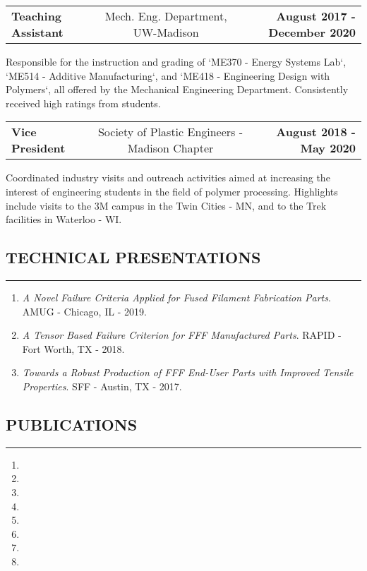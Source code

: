 \documentclass[11pt,letterpaper]{article}
\makeatletter
\newcommand{\headerrow}[3]
{\vspace{0.4em}
\noindent
\begin{tabular*}{\textwidth}{l @{\extracolsep{\fill}} cr}
	\textbf{#1} & %
	#2 &		  %
	\textbf{#3}\\ %
\end{tabular*}}
\makeatother
\begin{document}
\headerrow
{Teaching Assistant}
{Mech. Eng. Department, UW-Madison} 
{August 2017 - December 2020}
Responsible for the instruction and grading of `ME370 - Energy Systems Lab`, `ME514 - Additive Manufacturing`, and `ME418 - Engineering Design with Polymers`, all offered by the Mechanical Engineering Department. Consistently received high ratings from students.

\headerrow
{Vice President}
{Society of Plastic Engineers - Madison Chapter} 
{August 2018 - May 2020}
Coordinated industry visits and outreach activities aimed at increasing the interest of engineering students in the field of polymer processing. Highlights include visits to the 3M campus in the Twin Cities - MN, and to the Trek facilities in Waterloo - WI. 

\subsection*{TECHNICAL PRESENTATIONS}
\vspace{-0.5em}
\hrule
\vspace{0.6em}

\begin{enumerate}
	\item \emph{A Novel Failure Criteria Applied for Fused Filament Fabrication Parts}. AMUG - Chicago, IL - 2019. 
	\item \emph{A Tensor Based Failure Criterion for FFF Manufactured Parts}.  RAPID - Fort Worth, TX - 2018.
	\item \emph{Towards a Robust Production of FFF End-User Parts with Improved Tensile Properties}. SFF - Austin, TX - 2017. 

\end{enumerate}


\subsection*{PUBLICATIONS}
	\vspace{-0.5em}
	\hrule
	\vspace{0.6em}

\begin{enumerate}
	\item {}
	\item {}
	\item {}
	\item {}
	\item {}
	\item {}
	\item {}
	\item {}
\end{enumerate}
	
\end{document}
